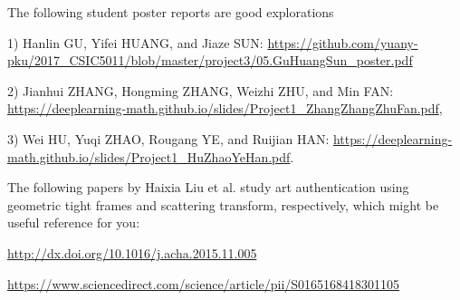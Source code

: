 \documentclass[11pt]{article}
\begin{document}
The following student poster reports are good explorations

1) Hanlin GU, Yifei HUANG, and Jiaze SUN: \url{https://github.com/yuany-pku/2017_CSIC5011/blob/master/project3/05.GuHuangSun_poster.pdf}

2) Jianhui ZHANG, Hongming ZHANG, Weizhi ZHU, and Min FAN: \url{https://deeplearning-math.github.io/slides/Project1_ZhangZhangZhuFan.pdf},

3) Wei HU, Yuqi ZHAO, Rougang YE, and Ruijian HAN: \url{https://deeplearning-math.github.io/slides/Project1_HuZhaoYeHan.pdf}.


The following papers by Haixia Liu et al. study art authentication using geometric tight frames and scattering transform, respectively, which might be useful reference for you:

\url{http://dx.doi.org/10.1016/j.acha.2015.11.005}

\url{https://www.sciencedirect.com/science/article/pii/S0165168418301105}


%
%
%
%
%
\end{document}

